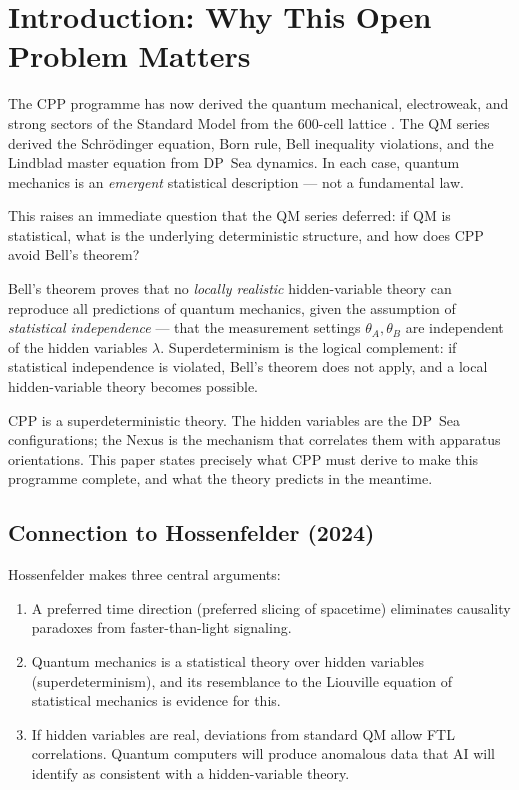 \documentclass[11pt,letterpaper]{article}
\begin{document}
\bigskip
\raggedright


\tableofcontents
\newpage

\section{Introduction: Why This Open Problem Matters}

The CPP programme has now derived the quantum mechanical, electroweak,
and strong sectors of the Standard Model from the 600-cell lattice
\citep{cpp_qm_series,cpp_ew_unified,cpp_ss_unified}.  The QM series
derived the Schrödinger equation, Born rule, Bell inequality
violations, and the Lindblad master equation from DP~Sea dynamics.
In each case, quantum mechanics is an \emph{emergent} statistical
description --- not a fundamental law.

This raises an immediate question that the QM series deferred: if QM
is statistical, what is the underlying deterministic structure, and
how does CPP avoid Bell's theorem?

Bell's theorem proves that no \emph{locally realistic} hidden-variable
theory can reproduce all predictions of quantum mechanics, given the
assumption of \emph{statistical independence} --- that the measurement
settings $\theta_A, \theta_B$ are independent of the hidden variables
$\lambda$.  Superdeterminism is the logical complement: if statistical
independence is violated, Bell's theorem does not apply, and a local
hidden-variable theory becomes possible.

CPP is a superdeterministic theory.  The hidden variables are the
DP~Sea configurations; the Nexus is the mechanism that correlates
them with apparatus orientations.  This paper states precisely what
CPP must derive to make this programme complete, and what the theory
predicts in the meantime.

\subsection{Connection to Hossenfelder (2024)}

Hossenfelder \citep{hossenfelder2024} makes three central arguments:

\begin{enumerate}
\item A preferred time direction (preferred slicing of spacetime)
  eliminates causality paradoxes from faster-than-light signaling.
\item Quantum mechanics is a statistical theory over hidden variables
  (superdeterminism), and its resemblance to the Liouville equation
  of statistical mechanics is evidence for this.
\item If hidden variables are real, deviations from standard QM
  allow FTL correlations.  Quantum computers will produce anomalous
  data that AI will identify as consistent with a hidden-variable
  theory.
\end{enumerate}
\end{document}
